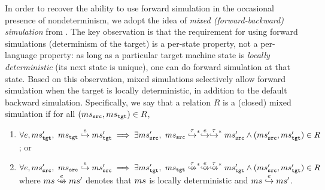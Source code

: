 In order to recover the ability to use forward simulation in the occasional presence of nondeterminism,
we adopt the idea of \emph{mixed (forward-backward) simulation} from \cite{neis:pilsner}.
The key observation is that
the requirement for using forward simulations (\ie determinism of the target) is a per-state property,
not a per-language property: as long as a particular target machine state is \emph{locally deterministic} (\ie its next state is unique),
one can do forward simulation at that state.
Based on this observation, mixed simulations selectively allow forward
simulation when the target is locally deterministic, in addition to
the default backward simulation.
%
Specifically, we say that a relation $R$ is a (closed) mixed simulation if
for all $(ms{}_{\texttt{src}{}}, ms{}_{\texttt{tgt}{}}) \in R$,
\begin{enumerate}
\item
  $\forall e, \mstgt',~ \mstgt \estep{e} \mstgt' \implies {}
  \exists \mssrc',~ \mssrc \estep{\tau}^{\raisebox{-1mm}{\scriptsize$\ast$}} \estep{e}\estep{\tau}^{\raisebox{-1mm}{\scriptsize$\ast$}} \mssrc' \land (\mssrc', \mstgt') \in R$; or
\item
  $\forall e, \mssrc',~ \mssrc \estep{e} \mssrc' \implies {}
  \exists \mstgt',~ \mstgt \eustep{\tau}^{\raisebox{-1mm}{\scriptsize$\ast$}} \eustep{e}\eustep{\tau}^{\raisebox{-1mm}{\scriptsize$\ast$}} \mstgt' \land (\mssrc', \mstgt') \in R$\\
  where $\ms \eustep{e} \ms'$ denotes that $ms$ is locally deterministic and $ms \stackrel{e}{\hookrightarrow} ms'$.
\end{enumerate}

